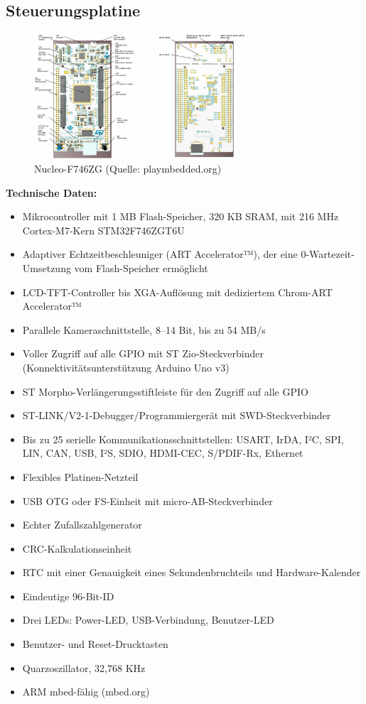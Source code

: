 \subsection{Steuerungsplatine}
\begin{figure}[!h]  %
	\centering\includegraphics[width=0.7\textwidth]{images/nucleo.jpg}
	\caption{Nucleo-F746ZG   (Quelle: playmbedded.org)}
	\label{Nucleo}
\end{figure}
\textbf{Technische Daten:}
\begin{itemize} 
	\item Mikrocontroller mit 1 MB Flash-Speicher, 320 KB SRAM, mit 216 MHz Cortex-M7-Kern STM32F746ZGT6U
	\item Adaptiver Echtzeitbeschleuniger (ART Accelerator™), der eine 0-Wartezeit-Umsetzung vom Flash-Speicher ermöglicht
	\item LCD-TFT-Controller bis XGA-Auflösung mit dediziertem Chrom-ART Accelerator™
	\item Parallele Kameraschnittstelle, 8–14 Bit, bis zu 54 MB/s
	\item Voller Zugriff auf alle GPIO mit ST Zio-Steckverbinder (Konnektivitätsunterstützung Arduino Uno v3)
	\item ST Morpho-Verlängerungsstiftleiste für den Zugriff auf alle GPIO
	\item ST-LINK/V2-1-Debugger/Programmiergerät mit SWD-Steckverbinder
	\item Bis zu 25 serielle Kommunikationsschnittstellen: USART, IrDA, I²C, SPI, LIN, CAN, USB, I²S, SDIO, HDMI-CEC, S/PDIF-Rx, Ethernet
	\item Flexibles Platinen-Netzteil
	\item USB OTG oder FS-Einheit mit micro-AB-Steckverbinder
	\item Echter Zufallszahlgenerator
	\item CRC-Kalkulationseinheit
	\item RTC mit einer Genauigkeit eines Sekundenbruchteils und Hardware-Kalender
	\item Eindeutige 96-Bit-ID
	\item Drei LEDs: Power-LED, USB-Verbindung, Benutzer-LED
	\item Benutzer- und Reset-Drucktasten
	\item Quarzoszillator, 32,768 KHz
	\item ARM mbed-fähig (mbed.org)
\end{itemize}

